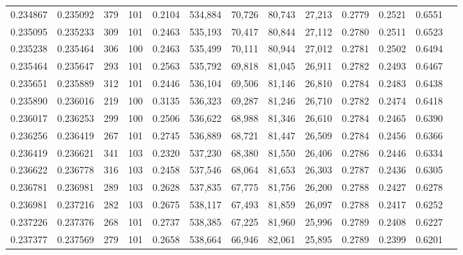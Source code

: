 \begin{tabular}{rrrrrrrrrrrrr}
0.234867 & 0.235092 &   379 & 101 &                                     0.2104 & 534,884 &  70,726 &  80,743 &  27,213 & 0.2779 & 0.2521 & 0.6551 \\
0.235095 & 0.235233 &   309 & 101 &                                     0.2463 & 535,193 &  70,417 &  80,844 &  27,112 & 0.2780 & 0.2511 & 0.6523 \\
0.235238 & 0.235464 &   306 & 100 &                                     0.2463 & 535,499 &  70,111 &  80,944 &  27,012 & 0.2781 & 0.2502 & 0.6494 \\
0.235464 & 0.235647 &   293 & 101 &                                     0.2563 & 535,792 &  69,818 &  81,045 &  26,911 & 0.2782 & 0.2493 & 0.6467 \\
0.235651 & 0.235889 &   312 & 101 &                                     0.2446 & 536,104 &  69,506 &  81,146 &  26,810 & 0.2784 & 0.2483 & 0.6438 \\
0.235890 & 0.236016 &   219 & 100 &                                     0.3135 & 536,323 &  69,287 &  81,246 &  26,710 & 0.2782 & 0.2474 & 0.6418 \\
0.236017 & 0.236253 &   299 & 100 &                                     0.2506 & 536,622 &  68,988 &  81,346 &  26,610 & 0.2784 & 0.2465 & 0.6390 \\
0.236256 & 0.236419 &   267 & 101 &                                     0.2745 & 536,889 &  68,721 &  81,447 &  26,509 & 0.2784 & 0.2456 & 0.6366 \\
0.236419 & 0.236621 &   341 & 103 &                                     0.2320 & 537,230 &  68,380 &  81,550 &  26,406 & 0.2786 & 0.2446 & 0.6334 \\
0.236622 & 0.236778 &   316 & 103 &                                     0.2458 & 537,546 &  68,064 &  81,653 &  26,303 & 0.2787 & 0.2436 & 0.6305 \\
0.236781 & 0.236981 &   289 & 103 &                                     0.2628 & 537,835 &  67,775 &  81,756 &  26,200 & 0.2788 & 0.2427 & 0.6278 \\
0.236981 & 0.237216 &   282 & 103 &                                     0.2675 & 538,117 &  67,493 &  81,859 &  26,097 & 0.2788 & 0.2417 & 0.6252 \\
0.237226 & 0.237376 &   268 & 101 &                                     0.2737 & 538,385 &  67,225 &  81,960 &  25,996 & 0.2789 & 0.2408 & 0.6227 \\
0.237377 & 0.237569 &   279 & 101 &                                     0.2658 & 538,664 &  66,946 &  82,061 &  25,895 & 0.2789 & 0.2399 & 0.6201 \\

\end{tabular}
